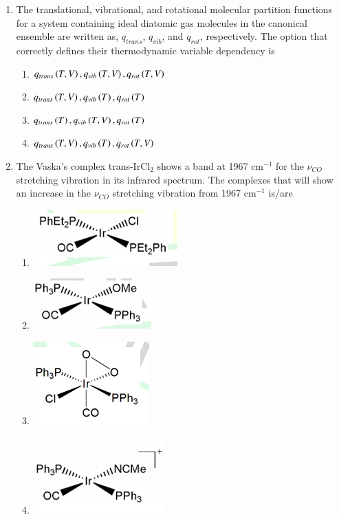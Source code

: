\documentclass[journal,12pt,onecolumn]{IEEEtran}
\theoremstyle{remark}
\begin{document}
\begin{enumerate}
\item The translational, vibrational, and rotational molecular partition functions for a system containing ideal diatomic gas molecules in the canonical ensemble  are written as, $q_{trans}$, $q_{vib}$, and $q_{rot}$, respectively. The option that correctly defines their thermodynamic variable dependency is
    \begin{enumerate}
        \item $q_{trans} \left(T, V\right), q_{vib} \left(T, V\right), q_{rot}\left(T, V\right)$
        \item $q_{trans} \left(T, V\right), q_{vib} \left(T\right), q_{rot}\left(T\right)$
        \item $q_{trans} \left(T\right), q_{vib} \left(T, V\right), q_{rot}\left(T\right)$
        \item $q_{trans} \left(T, V\right), q_{vib} \left(T\right), q_{rot}\left(T, V\right)$
    \end{enumerate}      \hfill{}
\item The Vaska's complex trans-IrCl$_{2}$ shows a band at 1967 cm$^{-1}$ for the $\nu_{CO}$ stretching vibration in its infrared spectrum. The complexes that will show an increase in the $\nu_{CO}$ stretching vibration from 1967 cm$^{-1}$ is/are
 \begin{multicols}{2}
    \begin{enumerate}
        \item \includegraphics[width=0.2\columnwidth]{figs/q21a.png}
        \item \includegraphics[width=0.2\columnwidth]{figs/q21b.png}
        \item \includegraphics[width=0.2\columnwidth]{figs/q21c.png}
        \item \includegraphics[width=0.2\columnwidth]{figs/q21d.png}
    \end{enumerate}      \hfill{}
    \end{multicols}




\end{enumerate}
\end{document}
